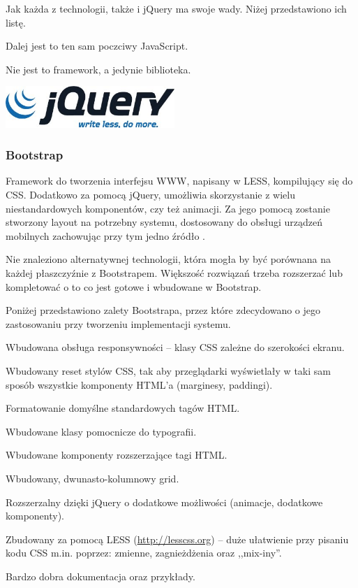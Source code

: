 Jak każda z technologii, także i jQuery ma swoje wady. Niżej przedstawiono ich listę.
\begin{packed_item}
    \item{Dalej jest to ten sam poczciwy JavaScript.}
    \item{Nie jest to framework, a jedynie biblioteka.}
\end{packed_item}

\begin{center}
    \includegraphics[width=0.48\textwidth]{img/logos/jquery.jpg}
\end{center}

\newpage
\subsubsection{Bootstrap}
Framework do tworzenia interfejsu WWW, napisany w LESS, kompilujący się do CSS. Dodatkowo za pomocą jQuery, umożliwia skorzystanie z wielu niestandardowych komponentów, czy też animacji. Za jego pomocą zostanie stworzony layout na potrzebny systemu, dostosowany do obsługi urządzeń mobilnych zachowując przy tym jedno źródło \cite{bootstrap}.

Nie znaleziono alternatywnej technologii, która mogła by być porównana na każdej płaszczyźnie z Bootstrapem. Większość rozwiązań trzeba rozszerzać lub kompletować o to co jest gotowe i wbudowane w Bootstrap.

Poniżej przedstawiono zalety Bootstrapa, przez które zdecydowano o jego zastosowaniu przy tworzeniu implementacji systemu.
\begin{packed_item}
    \item{Wbudowana obsługa responsywności -- klasy CSS zależne do szerokości ekranu.}
    \item{Wbudowany reset stylów CSS, tak aby przeglądarki wyświetlały w taki sam sposób wszystkie komponenty HTML'a (marginesy, paddingi).}
    \item{Formatowanie domyślne standardowych tagów HTML.}
    \item{Wbudowane klasy pomocnicze do typografii.}
    \item{Wbudowane komponenty rozszerzające tagi HTML.}
    \item{Wbudowany, dwunasto-kolumnowy grid.}
    \item{Rozszerzalny dzięki jQuery o dodatkowe możliwości (animacje, dodatkowe komponenty).}
    \item{Zbudowany za pomocą LESS (\url{http://lesscss.org}) -- duże ułatwienie przy pisaniu kodu CSS m.in. poprzez: zmienne, zagnieżdżenia oraz ,,mix-iny''.}
    \item{Bardzo dobra dokumentacja oraz przykłady.}
\end{packed_item}

